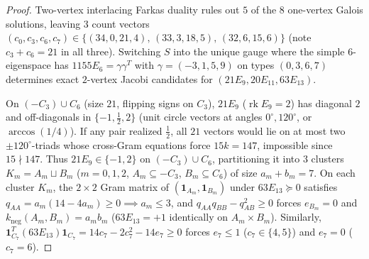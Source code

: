\documentclass[11pt,reqno]{amsart}
\theoremstyle{definition}
\theoremstyle{remark}
\numberwithin{equation}{section}
\numberwithin{table}{section}
\DeclareMathOperator{\rk}{rk}
\begin{document}
\begin{proof}
Two-vertex interlacing Farkas duality rules out $5$ of the $8$ one-vertex Galois solutions, leaving $3$ count vectors $(c_0, c_3, c_6, c_7) \in \{(34, 0, 21, 4),\, (33, 3, 18, 5),\, (32, 6, 15, 6)\}$ (note $c_3 + c_6 = 21$ in all three). Switching $S$ into the unique gauge where the simple $6$-eigenspace has $1155 E_6 = \gamma \gamma^T$ with $\gamma = (-3, 1, 5, 9)$ on types $(0, 3, 6, 7)$ determines exact $2$-vertex Jacobi candidates for $(21 E_9, 20 E_{11}, 63 E_{13})$.

On $(-C_3) \cup C_6$ (size $21$, flipping signs on $C_3$), $21 E_9$ ($\rk E_9 = 2$) has diagonal $2$ and off-diagonals in $\{-1, \frac{1}{2}, 2\}$ (unit circle vectors at angles $0^\circ, 120^\circ$, or $\arccos(1/4)$). If any pair realized $\frac{1}{2}$, all $21$ vectors would lie on at most two $\pm 120^\circ$-triads whose cross-Gram equations force $15k = 147$, impossible since $15 \nmid 147$. Thus $21 E_9 \in \{-1, 2\}$ on $(-C_3) \cup C_6$, partitioning it into $3$ clusters $K_m = A_m \sqcup B_m$ ($m = 0, 1, 2$, $A_m \subseteq -C_3$, $B_m \subseteq C_6$) of size $a_m + b_m = 7$. On each cluster $K_m$, the $2 \times 2$ Gram matrix of $(\mathbf{1}_{A_m}, \mathbf{1}_{B_m})$ under $63 E_{13} \succeq 0$ satisfies $q_{AA} = a_m(14 - 4a_m) \ge 0 \implies a_m \le 3$, and $q_{AA} q_{BB} - q_{AB}^2 \ge 0$ forces $e_{B_m} = 0$ and $k_{\mathrm{neg}}(A_m, B_m) = a_m b_m$ ($63 E_{13} = +1$ identically on $A_m \times B_m$). Similarly, $\mathbf{1}_{C_7}^T (63 E_{13}) \mathbf{1}_{C_7} = 14 c_7 - 2 c_7^2 - 14 e_7 \ge 0$ forces $e_7 \le 1$ ($c_7 \in \{4, 5\}$) and $e_7 = 0$ ($c_7 = 6$).


\end{proof}
\end{document}
